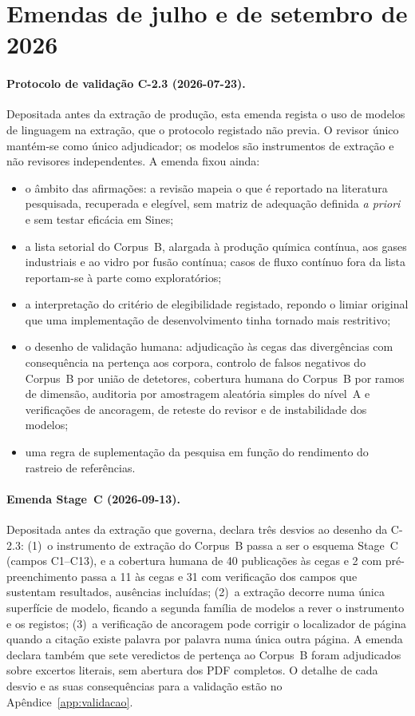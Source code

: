\section{Emendas de julho e de setembro de 2026}
\label{sec:apA-emendas}

\paragraph{Protocolo de validação C-2.3 (2026-07-23).} Depositada antes da extração de produção, esta emenda regista o uso de modelos de linguagem na extração, que o protocolo registado não previa. O revisor único mantém-se como único adjudicador; os modelos são instrumentos de extração e não revisores independentes. A emenda fixou ainda:
\begin{itemize}[nosep]
  \item o âmbito das afirmações: a revisão mapeia o que é reportado na literatura pesquisada, recuperada e elegível, sem matriz de adequação definida \emph{a priori} e sem testar eficácia em Sines;
  \item a lista setorial do Corpus~B, alargada à produção química contínua, aos gases industriais e ao vidro por fusão contínua; casos de fluxo contínuo fora da lista reportam-se à parte como exploratórios;
  \item a interpretação do critério de elegibilidade registado, repondo o limiar original que uma implementação de desenvolvimento tinha tornado mais restritivo;
  \item o desenho de validação humana: adjudicação às cegas das divergências com consequência na pertença aos corpora, controlo de falsos negativos do Corpus~B por união de detetores, cobertura humana do Corpus~B por ramos de dimensão, auditoria por amostragem aleatória simples do nível~A e verificações de ancoragem, de reteste do revisor e de instabilidade dos modelos;
  \item uma regra de suplementação da pesquisa em função do rendimento do rastreio de referências.
\end{itemize}

\paragraph{Emenda Stage~C (2026-09-13).} Depositada antes da extração que governa, declara três desvios ao desenho da C-2.3: (1)~o instrumento de extração do Corpus~B passa a ser o esquema Stage~C (campos C1--C13), e a cobertura humana de 40 publicações às cegas e 2 com pré-preenchimento passa a 11 às cegas e 31 com verificação dos campos que sustentam resultados, ausências incluídas; (2)~a extração decorre numa única superfície de modelo, ficando a segunda família de modelos a rever o instrumento e os registos; (3)~a verificação de ancoragem pode corrigir o localizador de página quando a citação existe palavra por palavra numa única outra página. A emenda declara também que sete veredictos de pertença ao Corpus~B foram adjudicados sobre excertos literais, sem abertura dos PDF completos. O detalhe de cada desvio e as suas consequências para a validação estão no Apêndice~\ref{app:validacao}.

